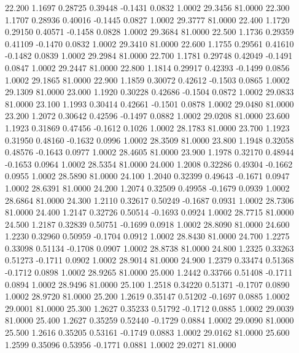   22.200   1.1697   0.28725   0.39448  -0.1431   0.0832   1.0002  29.3456  81.0000
  22.300   1.1707   0.28936   0.40016  -0.1445   0.0827   1.0002  29.3777  81.0000
  22.400   1.1720   0.29150   0.40571  -0.1458   0.0828   1.0002  29.3684  81.0000
  22.500   1.1736   0.29359   0.41109  -0.1470   0.0832   1.0002  29.3410  81.0000
  22.600   1.1755   0.29561   0.41610  -0.1482   0.0839   1.0002  29.2984  81.0000
  22.700   1.1781   0.29748   0.42049  -0.1491   0.0847   1.0002  29.2447  81.0000
  22.800   1.1814   0.29917   0.42393  -0.1499   0.0856   1.0002  29.1865  81.0000
  22.900   1.1859   0.30072   0.42612  -0.1503   0.0865   1.0002  29.1309  81.0000
  23.000   1.1920   0.30228   0.42686  -0.1504   0.0872   1.0002  29.0833  81.0000
  23.100   1.1993   0.30414   0.42661  -0.1501   0.0878   1.0002  29.0480  81.0000
  23.200   1.2072   0.30642   0.42596  -0.1497   0.0882   1.0002  29.0208  81.0000
  23.600   1.1923   0.31869   0.47456  -0.1612   0.1026   1.0002  28.1783  81.0000
  23.700   1.1923   0.31950   0.48160  -0.1632   0.0996   1.0002  28.3509  81.0000
  23.800   1.1948   0.32058   0.48576  -0.1643   0.0977   1.0002  28.4605  81.0000
  23.900   1.1978   0.32170   0.48944  -0.1653   0.0964   1.0002  28.5354  81.0000
  24.000   1.2008   0.32286   0.49304  -0.1662   0.0955   1.0002  28.5890  81.0000
  24.100   1.2040   0.32399   0.49643  -0.1671   0.0947   1.0002  28.6391  81.0000
  24.200   1.2074   0.32509   0.49958  -0.1679   0.0939   1.0002  28.6864  81.0000
  24.300   1.2110   0.32617   0.50249  -0.1687   0.0931   1.0002  28.7306  81.0000
  24.400   1.2147   0.32726   0.50514  -0.1693   0.0924   1.0002  28.7715  81.0000
  24.500   1.2187   0.32839   0.50751  -0.1699   0.0918   1.0002  28.8090  81.0000
  24.600   1.2230   0.32960   0.50959  -0.1704   0.0912   1.0002  28.8430  81.0000
  24.700   1.2275   0.33098   0.51134  -0.1708   0.0907   1.0002  28.8738  81.0000
  24.800   1.2325   0.33263   0.51273  -0.1711   0.0902   1.0002  28.9014  81.0000
  24.900   1.2379   0.33474   0.51368  -0.1712   0.0898   1.0002  28.9265  81.0000
  25.000   1.2442   0.33766   0.51408  -0.1711   0.0894   1.0002  28.9496  81.0000
  25.100   1.2518   0.34220   0.51371  -0.1707   0.0890   1.0002  28.9720  81.0000
  25.200   1.2619   0.35147   0.51202  -0.1697   0.0885   1.0002  29.0001  81.0000
  25.300   1.2627   0.35233   0.51792  -0.1712   0.0885   1.0002  29.0039  81.0000
  25.400   1.2627   0.35259   0.52440  -0.1729   0.0884   1.0002  29.0090  81.0000
  25.500   1.2616   0.35205   0.53161  -0.1749   0.0883   1.0002  29.0162  81.0000
  25.600   1.2599   0.35096   0.53956  -0.1771   0.0881   1.0002  29.0271  81.0000
